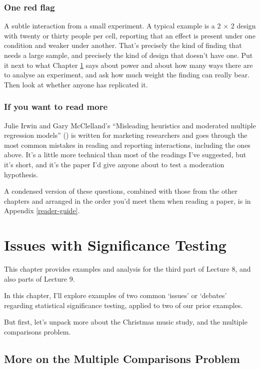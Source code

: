 \documentclass[
]{book}
\begin{document}
\subsection{One red flag}\label{one-red-flag-8}

A subtle interaction from a small experiment. A typical example is a 2 × 2 design with twenty or thirty people per cell, reporting that an effect is present under one condition and weaker under another. That's precisely the kind of finding that needs a large sample, and precisely the kind of design that doesn't have one. Put it next to what Chapter \ref{Issues} says about power and about how many ways there are to analyse an experiment, and ask how much weight the finding can really bear. Then look at whether anyone has replicated it.

\subsection{If you want to read more}\label{if-you-want-to-read-more-8}

Julie Irwin and Gary McClelland's ``Misleading heuristics and moderated multiple regression models'' () is written for marketing researchers and goes through the most common mistakes in reading and reporting interactions, including the ones above. It's a little more technical than most of the readings I've suggested, but it's short, and it's the paper I'd give anyone about to test a moderation hypothesis.

A condensed version of these questions, combined with those from the other chapters and arranged in the order you'd meet them when reading a paper, is in Appendix \ref{reader-guide}.

\chapter{Issues with Significance Testing}\label{Issues}

This chapter provides examples and analysis for the third part of Lecture 8, and also parts of Lecture 9.

In this chapter, I'll explore examples of two common `issues' or `debates' regarding statistical significance testing, applied to two of our prior examples.

But first, let's unpack more about the Christmas music study, and the multiple comparisons problem.

\section{More on the Multiple Comparisons Problem}\label{more-on-the-multiple-comparisons-problem}
\end{document}
